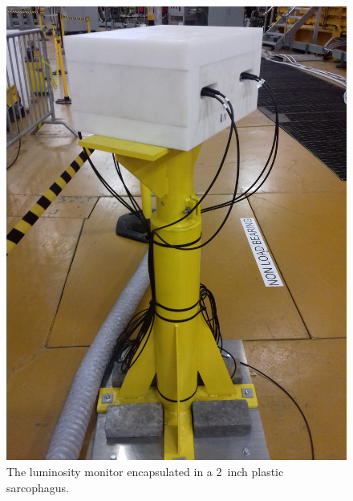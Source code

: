 \documentclass[a4paper,11pt]{article}
\begin{document}
\begin{figure}
  \begin{center}
    \includegraphics[width=1.0\columnwidth]{./figures/LM4.jpg}
    \caption{The luminosity monitor encapsulated in a 2~inch plastic sarcophagus.}
    \label{fig:LM2}
  \end{center}
\end{figure}
\end{document}
